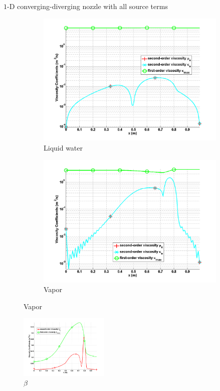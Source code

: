 \documentclass[xcolor=dvipsnames,10pt]{beamer}
\begin{document}
\begin{frame}{$1$-D converging-diverging nozzle with all source terms}
\begin{figure}[H]
\begin{subfigure}[b]{0.38\textwidth}
\centering
\includegraphics[width=\textwidth]{../figures/SEM/Aint1e4_liquid_viscosity_kappa_mu.png}
\caption{Liquid water}
\end{subfigure}
%
\begin{subfigure}[b]{0.38\textwidth}
\centering
\includegraphics[width=\textwidth]{../figures/SEM/Aint1e4_vapor_viscosity_kappa_mu.png}
\caption{Vapor}
\end{subfigure}
\end{figure}
\begin{figure}
\centering
\includegraphics[width=0.38\textwidth]{../figures/SEM/Aint1e4_liquid_beta.png}
\caption{$\beta$}
\end{figure}
\end{frame}
\end{document}
